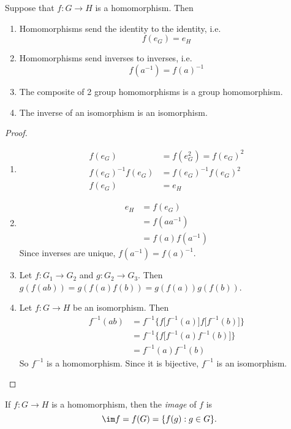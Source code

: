 \documentclass[a4paper]{article}
\begin{document}
\begin{prop}
  Suppose that $f: G\rightarrow H$ is a homomorphism. Then
  \begin{enumerate}
    \item Homomorphisms send the identity to the identity, i.e.
      \[
        f(e_G) = e_H
      \]
    \item Homomorphisms send inverses to inverses, i.e.
      \[
        f(a^{-1}) = f(a)^{-1}
      \]
    \item The composite of 2 group homomorphisms is a group homomorphism.
    \item The inverse of an isomorphism is an isomorphism.
  \end{enumerate}
\end{prop}
\begin{proof}\leavevmode
  \begin{enumerate}
    \item \begin{align*}
        f(e_G) &= f(e_G^2) = f(e_G)^2\\
        f(e_G)^{-1}f(e_G) &= f(e_G)^{-1}f(e_G)^2\\
        f(e_G) &= e_H
      \end{align*}
    \item \begin{align*}
        e_H &= f(e_G)\\
        &= f(aa^{-1})\\
        &= f(a)f(a^{-1})
      \end{align*}
      Since inverses are unique, $f(a^{-1}) = f(a)^{-1}$.
    \item Let $f:G_1 \rightarrow G_2$ and $g:G_2 \rightarrow G_3$. Then $g(f(ab)) = g(f(a)f(b)) = g(f(a))g(f(b))$.
    \item Let $f:G \rightarrow H$ be an isomorphism. Then
      \begin{align*}
        f^{-1}(ab) &= f^{-1}\Big\{f\big[f^{-1}(a)\big]f\big[f^{-1}(b)\big]\Big\}\\
        &= f^{-1}\Big\{f\big[f^{-1}(a)f^{-1}(b)\big]\Big\}\\
        &= f^{-1}(a)f^{-1}(b)
      \end{align*}
      So $f^{-1}$ is a homomorphism. Since it is bijective, $f^{-1}$ is an isomorphism.\qedhere
  \end{enumerate}
\end{proof}

\begin{defi}
  If $f:G\rightarrow H$ is a homomorphism, then the \emph{image} of $f$ is
  \[
    \im f = f(G) = \{f(g):g\in G\}.
  \]
\end{defi}
\end{document}

